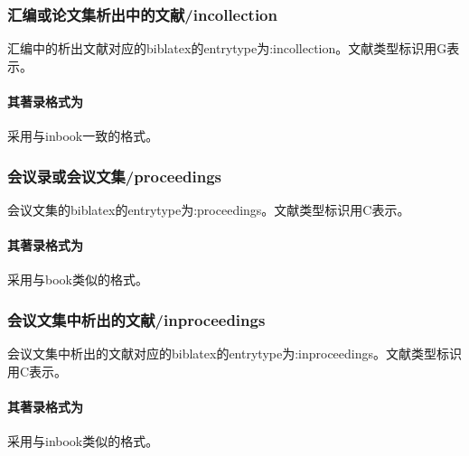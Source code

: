 \subsubsection{汇编或论文集析出中的文献/incollection}
\begin{refentry}{}{}
汇编中的析出文献对应的biblatex的entrytype为:incollection。文献类型标识用G表示。

\paragraph{其著录格式为} 采用与inbook一致的格式。
\end{refentry}

\subsubsection{会议录或会议文集/proceedings}
\begin{refentry}{}{}
会议文集的biblatex的entrytype为:proceedings。文献类型标识用C表示。

\paragraph{其著录格式为} 采用与book类似的格式。
\end{refentry}

\subsubsection{会议文集中析出的文献/inproceedings}
\begin{refentry}{}{}
会议文集中析出的文献对应的biblatex的entrytype为:inproceedings。文献类型标识用C表示。

\paragraph{其著录格式为} 采用与inbook类似的格式。
\end{refentry}

